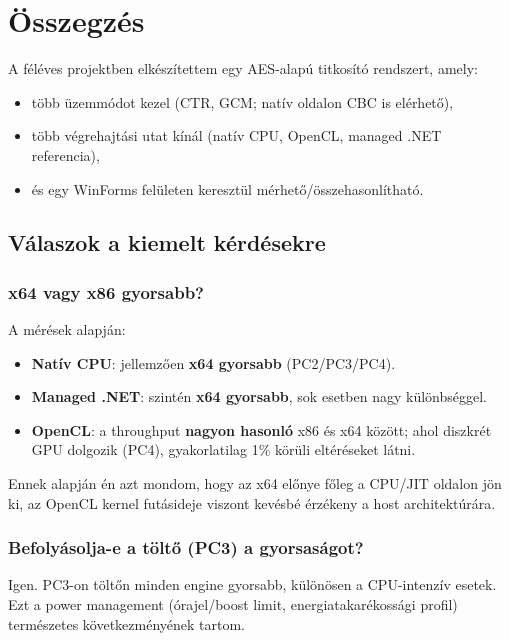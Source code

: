 \chapter{Összegzés}

A féléves projektben elkészítettem egy AES-alapú titkosító rendszert, amely:

\begin{itemize}
  \item több üzemmódot kezel (CTR, GCM; natív oldalon CBC is elérhető),
  \item több végrehajtási utat kínál (natív CPU, OpenCL, managed .NET referencia),
  \item és egy WinForms felületen keresztül mérhető/összehasonlítható.
\end{itemize}

\section{Válaszok a kiemelt kérdésekre}

\subsection{x64 vagy x86 gyorsabb?}

A mérések alapján:

\begin{itemize}
  \item \textbf{Natív CPU}: jellemzően \textbf{x64 gyorsabb} (PC2/PC3/PC4).
  \item \textbf{Managed .NET}: szintén \textbf{x64 gyorsabb}, sok esetben nagy különbséggel.
  \item \textbf{OpenCL}: a throughput \textbf{nagyon hasonló} x86 és x64 között; ahol diszkrét GPU dolgozik (PC4),
        gyakorlatilag 1\% körüli eltéréseket látni.
\end{itemize}

Ennek alapján én azt mondom, hogy az x64 előnye főleg a CPU/JIT oldalon jön ki,
az OpenCL kernel futásideje viszont kevésbé érzékeny a host architektúrára.

\subsection{Befolyásolja-e a töltő (PC3) a gyorsaságot?}

Igen. PC3-on töltőn minden engine gyorsabb, különösen a CPU-intenzív esetek.
Ezt a power management (órajel/boost limit, energiatakarékossági profil) természetes következményének tartom.

